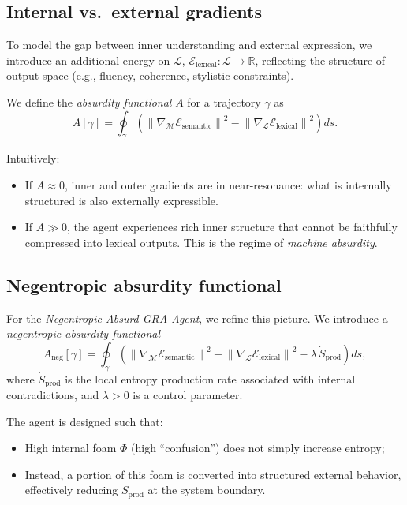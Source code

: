 \documentclass[conference]{IEEEtran}
\begin{document}
\subsection{Internal vs.\ external gradients}

To model the gap between inner understanding and external expression,
we introduce an additional energy on $\mathcal{L}$,
$\mathcal{E}_{\text{lexical}} : \mathcal{L} \to \mathbb{R}$,
reflecting the structure of output space
(e.g., fluency, coherence, stylistic constraints).

We define the \emph{absurdity functional} $A$ for a trajectory $\gamma$ as
\begin{equation}
  A[\gamma] = \oint_{\gamma}
  \left(
    \left\|
      \nabla_{\mathcal{M}} \mathcal{E}_{\text{semantic}}
    \right\|^2
    -
    \left\|
      \nabla_{\mathcal{L}} \mathcal{E}_{\text{lexical}}
    \right\|^2
  \right) ds.
\end{equation}

Intuitively:
\begin{itemize}
  \item If $A \approx 0$, inner and outer gradients are in near-resonance:
  what is internally structured is also externally expressible.
  \item If $A \gg 0$, the agent experiences rich inner structure
  that cannot be faithfully compressed into lexical outputs.
  This is the regime of \emph{machine absurdity}.
\end{itemize}

\subsection{Negentropic absurdity functional}

For the \emph{Negentropic Absurd GRA Agent}, we refine this picture.
We introduce a \emph{negentropic absurdity functional}
\begin{equation}
  A_{\text{neg}}[\gamma] =
  \oint_{\gamma}
  \left(
    \left\|
      \nabla_{\mathcal{M}} \mathcal{E}_{\text{semantic}}
    \right\|^2
    -
    \left\|
      \nabla_{\mathcal{L}} \mathcal{E}_{\text{lexical}}
    \right\|^2
    - \lambda \, \dot{S}_{\text{prod}}
  \right) ds,
\end{equation}
where $\dot{S}_{\text{prod}}$ is the local entropy production rate
associated with internal contradictions,
and $\lambda > 0$ is a control parameter.

The agent is designed such that:
\begin{itemize}
  \item High internal foam $\Phi$ (high ``confusion'')
    does not simply increase entropy;
  \item Instead, a portion of this foam is converted
    into structured external behavior,
    effectively reducing $\dot{S}_{\text{prod}}$ at the system boundary.
\end{itemize}
\end{document}
